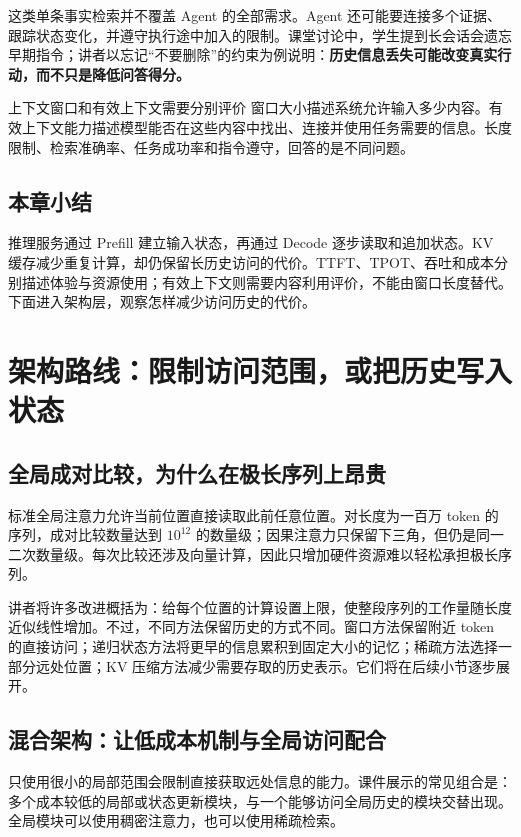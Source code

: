 \documentclass[11pt,a4paper]{article}
\begin{document}
这类单条事实检索并不覆盖 Agent 的全部需求。Agent 还可能要连接多个证据、跟踪状态变化，并遵守执行途中加入的限制。课堂讨论中，学生提到长会话会遗忘早期指令；讲者以忘记“不要删除”的约束为例说明：\textbf{历史信息丢失可能改变真实行动，而不只是降低问答得分。}

\begin{importantbox}{上下文窗口和有效上下文需要分别评价}
窗口大小描述系统允许输入多少内容。有效上下文能力描述模型能否在这些内容中找出、连接并使用任务需要的信息。长度限制、检索准确率、任务成功率和指令遵守，回答的是不同问题。
\end{importantbox}

\subsection{本章小结}

推理服务通过 Prefill 建立输入状态，再通过 Decode 逐步读取和追加状态。KV 缓存减少重复计算，却仍保留长历史访问的代价。TTFT、TPOT、吞吐和成本分别描述体验与资源使用；有效上下文则需要内容利用评价，不能由窗口长度替代。下面进入架构层，观察怎样减少访问历史的代价。

\clearpage
\section{架构路线：限制访问范围，或把历史写入状态}

\subsection{全局成对比较，为什么在极长序列上昂贵}

标准全局注意力允许当前位置直接读取此前任意位置。对长度为一百万 token 的序列，成对比较数量达到 $10^{12}$ 的数量级；因果注意力只保留下三角，但仍是同一二次数量级。每次比较还涉及向量计算，因此只增加硬件资源难以轻松承担极长序列。

讲者将许多改进概括为：给每个位置的计算设置上限，使整段序列的工作量随长度近似线性增加。不过，不同方法保留历史的方式不同。窗口方法保留附近 token 的直接访问；递归状态方法将更早的信息累积到固定大小的记忆；稀疏方法选择一部分远处位置；KV 压缩方法减少需要存取的历史表示。它们将在后续小节逐步展开。

\subsection{混合架构：让低成本机制与全局访问配合}

只使用很小的局部范围会限制直接获取远处信息的能力。课件展示的常见组合是：多个成本较低的局部或状态更新模块，与一个能够访问全局历史的模块交替出现。全局模块可以使用稠密注意力，也可以使用稀疏检索。
\end{document}
